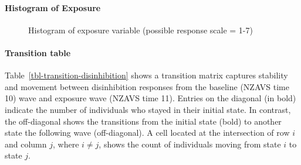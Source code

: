 \documentclass[
  singlecolumn]{article}
\let\oldparagraph\paragraph
\renewcommand{\paragraph}[1]{\oldparagraph{#1}\mbox{}}
\begin{document}
\paragraph{Histogram of Exposure}\label{histogram-of-exposure-1}

\begin{figure}


\caption{\label{fig-histogram-disinhibition}Histogram of exposure
variable (possible response scale = 1-7)}

\end{figure}%

\paragraph{Transition table}\label{transition-table-1}

Table~\ref{tbl-transition-disinhibition} shows a transition matrix
captures stability and movement between disinhibition responses from the
baseline (NZAVS time 10) wave and exposure wave (NZAVS time 11). Entries
on the diagonal (in bold) indicate the number of individuals who stayed
in their initial state. In contrast, the off-diagonal shows the
transitions from the initial state (bold) to another state the following
wave (off-diagonal). A cell located at the intersection of row \(i\) and
column \(j\), where \(i \neq j\), shows the count of individuals moving
from state \(i\) to state \(j\).
\end{document}
